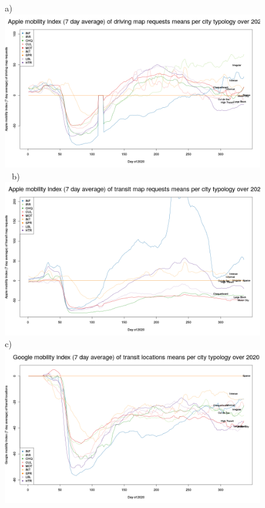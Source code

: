 \documentclass[preprint,12pt]{elsarticle}
\begin{document}
\begin{figure}
{\tiny a)}\includegraphics[trim={0 19 22 43},clip,scale=0.23]{Images/AppleDrivingClusterMean7Ave_2020.png}~
{\tiny b)}\includegraphics[trim={0 19 22 43},clip,scale=0.23]{Images/AppleTransitClusterMean_20207Ave.png}
\\
{\tiny c)}\includegraphics[trim={0 19 22 43},clip,scale=0.23]{Images/GoogleTransitClusterMean7Ave_2020.png}~

\end{figure}
\end{document}
